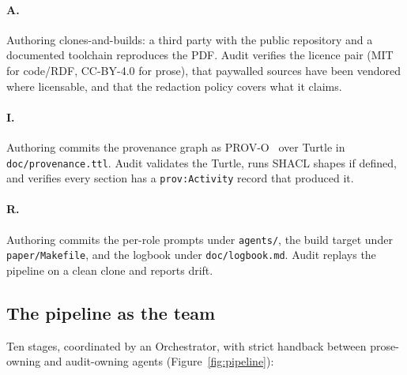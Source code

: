 \paragraph{A.}
Authoring clones-and-builds: a third party with the public repository
and a documented toolchain reproduces the PDF. Audit verifies the
licence pair (MIT for code/RDF, CC-BY-4.0 for prose), that paywalled
sources have been vendored where licensable, and that the redaction
policy covers what it claims.

\paragraph{I.}
Authoring commits the provenance graph as PROV-O~\cite{w3c2013provo} over Turtle in
\texttt{doc/provenance.ttl}. Audit validates the Turtle, runs SHACL
shapes if defined, and verifies every section has a
\texttt{prov:Activity} record that produced it.

\paragraph{R.}
Authoring commits the per-role prompts under \texttt{agents/}, the
build target under \texttt{paper/Makefile}, and the logbook under
\texttt{doc/logbook.md}. Audit replays the pipeline on a clean clone
and reports drift.

\subsection{The pipeline as the team}
\label{sec:pipeline}



Ten stages, coordinated by an Orchestrator, with strict handback
between prose-owning and audit-owning agents
(Figure~\ref{fig:pipeline}):

